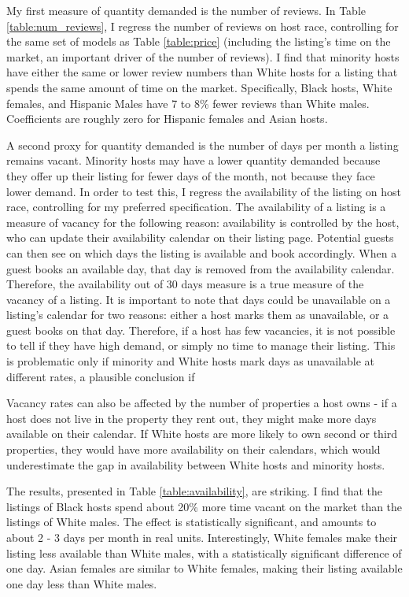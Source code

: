 My first measure of quantity demanded is the number of reviews. In Table \ref{table:num_reviews}, I regress the number of reviews on host race, controlling for the same set of models as Table \ref{table:price} (including the listing's time on the market, an important driver of the number of reviews). I find that minority hosts have either the same or lower review numbers than White hosts for a listing that spends the same amount of time on the market. Specifically, Black hosts, White females, and Hispanic Males have 7 to 8\% fewer reviews than White males. Coefficients are roughly zero for Hispanic females and Asian hosts. 

A second proxy for quantity demanded is the number of days per month a listing remains vacant. Minority hosts may have a lower quantity demanded because they offer up their listing for fewer days of the month, not because they face lower demand. In order to test this, I regress the availability of the listing on host race, controlling for my preferred specification. The availability of a listing is a measure of vacancy for the following reason: availability is controlled by the host, who can update their availability calendar on their listing page. Potential guests can then see on which days the listing is available and book accordingly. When a guest books an available day, that day is removed from the availability calendar. Therefore, the availability out of 30 days measure is a true measure of the vacancy of a listing. It is  important to note that days could be unavailable on a listing's calendar for two reasons: either a host marks them as unavailable, or a guest books on that day. Therefore, if a host has few vacancies, it is not possible to tell if they have high demand, or simply no time to manage their listing. This is problematic only if minority and White hosts mark days as unavailable at different rates, a plausible conclusion if 

Vacancy rates can also be affected by the number of properties a host owns - if a host does not live in the property they rent out, they might make more days available on their calendar. If White hosts are more likely to own second or third properties, they would have more availability on their calendars, which would underestimate the gap in availability between White hosts and minority hosts.  

The results, presented in Table \ref{table:availability}, are striking. I find that the listings of Black hosts spend about 20\% more time vacant on the market than the listings of White males. The effect is statistically significant, and amounts to about 2 - 3 days per month in real units. Interestingly, White females make their listing less available than White males, with a statistically significant difference of one day. Asian females are similar to White females, making their listing available one day less than White males. 

